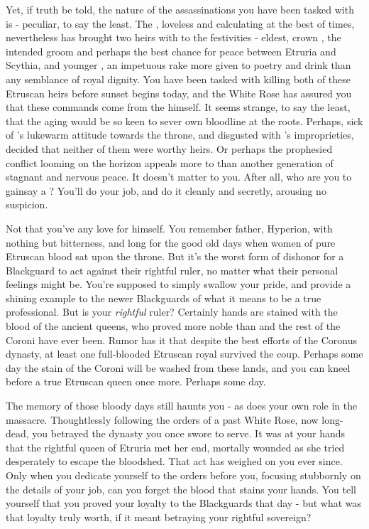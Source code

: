 \documentclass[char]{Kos}
\begin{document}
    Yet, if truth be told, the nature of the assassinations you have been tasked with is - peculiar, to say the least. The \cEtruriaKing{\monarch}, loveless and calculating at the best of times, nevertheless has brought \cEtruriaKing{\their} two heirs with \cEtruriaKing{\them} to the festivities - \cEtruriaKing{\their} eldest, crown \cGroom{\Prince} \cGroom{}, the intended groom and perhaps the best chance for peace between Etruria and Scythia, and \cEtruriaKing{\their} younger \cPoet{\offspring} \cPoet{}, an impetuous rake more given to poetry and drink than any semblance of royal dignity. You have been tasked with killing both of these Etruscan heirs before sunset begins today, and the White Rose has assured you that these commands come from the \cEtruriaKing{\monarch} himself. It seems strange, to say the least, that the aging \cEtruriaKing{} would be so keen to sever \cEtruriaKing{\their} own bloodline at the roots. Perhaps, sick of \cGroom{}'s lukewarm attitude towards the throne, and disgusted with \cPoet{}'s improprieties, \cEtruriaKing{\they} decided that neither of them were worthy heirs. Or perhaps the prophesied conflict looming on the horizon appeals more to \cEtruriaKing{} than another generation of stagnant and nervous peace. It doesn't matter to you. After all, who are you to gainsay a \cEtruriaKing{\monarch}? You'll do your job, and do it cleanly and secretly, arousing no suspicion. 

    Not that you've any love for \cEtruriaKing{} himself. You remember \cEtruriaKing{\their} father, Hyperion, with nothing but bitterness, and long for the good old days when women of pure Etruscan blood sat upon the throne. But it's the worst form of dishonor for a Blackguard to act against their rightful ruler, no matter what their personal feelings might be. You're supposed to simply swallow your pride, and provide a shining example to the newer Blackguards of what it means to be a true professional. But is \cEtruriaKing{\Monarch} \cEtruriaKing{} your \emph{rightful} ruler? Certainly \cEtruriaKing{\their} hands are stained with the blood of the ancient queens, who proved more noble than \cEtruriaKing{\they} and the rest of the Coroni have ever been. Rumor has it that despite the best efforts of the Coronus dynasty, at least one full-blooded Etruscan royal survived the coup. Perhaps some day the stain of the Coroni will be washed from these lands, and you can kneel before a true Etruscan queen once more. Perhaps some day.

The memory of those bloody days still haunts you - as does your own role in the massacre. Thoughtlessly following the orders of a past White Rose, now long-dead, you betrayed the dynasty you once swore to serve. It was at your hands that the rightful queen of Etruria met her end, mortally wounded as she tried desperately to escape the bloodshed. That act has weighed on you ever since. Only when you dedicate yourself to the orders before you, focusing stubbornly on the details of your job, can you forget the blood that stains your hands. You tell yourself that you proved your loyalty to the Blackguards that day - but what was that loyalty truly worth, if it meant betraying your rightful sovereign?
\end{document}

